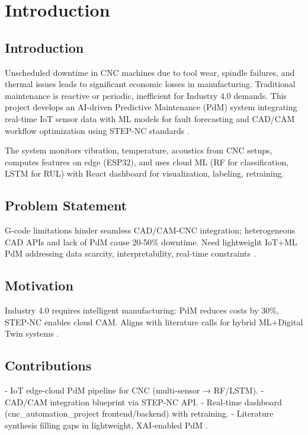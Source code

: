 \chapter{Introduction} %

\label{Chapter 1} %


\section{Introduction}
Unscheduled downtime in CNC machines due to tool wear, spindle failures, and thermal issues leads to significant economic losses in manufacturing. Traditional maintenance is reactive or periodic, inefficient for Industry 4.0 demands. This project develops an AI-driven Predictive Maintenance (PdM) system integrating real-time IoT sensor data with ML models for fault forecasting and CAD/CAM workflow optimization using STEP-NC standards \cite{luo2020hybrid,srivastava2023stepnc}.

The system monitors vibration, temperature, acoustics from CNC setups, computes features on edge (ESP32), and uses cloud ML (RF for classification, LSTM for RUL) with React dashboard for visualization, labeling, retraining.

\section{Problem Statement}
G-code limitations hinder seamless CAD/CAM-CNC integration; heterogeneous CAD APIs and lack of PdM cause 20-50\% downtime. Need lightweight IoT+ML PdM addressing data scarcity, interpretability, real-time constraints \cite{cinar2020mlpdm,wakhare2023optimizing}.

\section{Motivation}
Industry 4.0 requires intelligent manufacturing: PdM reduces costs by 30\%, STEP-NC enables cloud CAM. Aligns with literature calls for hybrid ML+Digital Twin systems \cite{paolanti2018mlindustry4}.

\section{Contributions}
- IoT edge-cloud PdM pipeline for CNC (multi-sensor → RF/LSTM).
- CAD/CAM integration blueprint via STEP-NC API.
- Real-time dashboard (cnc\_automation\_project frontend/backend) with retraining.
- Literature synthesis filling gaps in lightweight, XAI-enabled PdM \cite{sarikaya2024predictive,zhang2025camaservice}.

